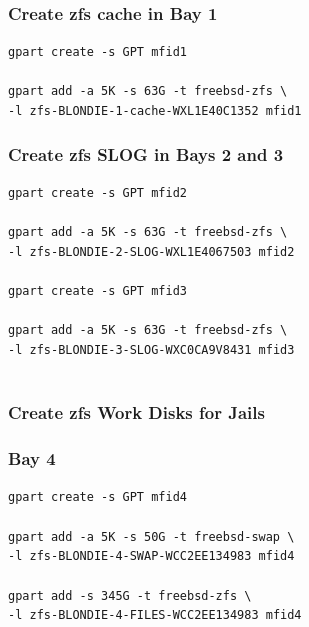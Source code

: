 \subsubsection{Create \gls{zfs} \gls{cache} in Bay 1}
\texttt{gpart create -s GPT mfid1}\\\\
\texttt{gpart add -a 5K -s 63G -t freebsd-zfs \textbackslash\\-l \gls{zfs}-BLONDIE-1-\gls{cache}-WXL1E40C1352 mfid1}

\subsubsection{Create \gls{zfs} SLOG in Bays 2 and 3}
\texttt{gpart create -s GPT mfid2}\\\\
\texttt{gpart add -a 5K -s 63G -t freebsd-zfs \textbackslash\\-l \gls{zfs}-BLONDIE-2-SLOG-WXL1E4067503 mfid2}\\\\
\texttt{gpart create -s GPT mfid3}\\\\
\texttt{gpart add -a 5K -s 63G -t freebsd-zfs \textbackslash\\ -l \gls{zfs}-BLONDIE-3-SLOG-WXC0CA9V8431 mfid3}\\\\

\subsubsection{Create \gls{zfs} Work Disks for Jails}
\subsubsection{Bay 4}
\texttt{gpart create -s GPT mfid4}\\\\
\texttt{gpart add -a 5K -s 50G -t freebsd-swap \textbackslash\\-l \gls{zfs}-BLONDIE-4-SWAP-WCC2EE134983 mfid4}\\\\
\texttt{gpart add -s 345G -t freebsd-\gls{zfs} \textbackslash\\-l \gls{zfs}-BLONDIE-4-FILES-WCC2EE134983 mfid4}
